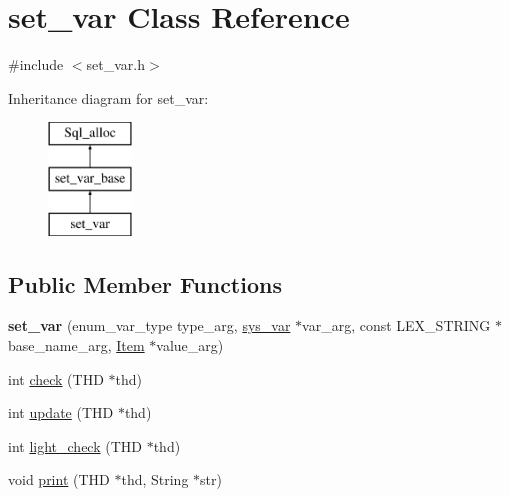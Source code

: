 \hypertarget{classset__var}{}\section{set\+\_\+var Class Reference}
\label{classset__var}


{\ttfamily \#include $<$set\+\_\+var.\+h$>$}

Inheritance diagram for set\+\_\+var\+:\begin{figure}[H]
\begin{center}
\leavevmode
\includegraphics[height=3.000000cm]{classset__var}
\end{center}
\end{figure}
\subsection*{Public Member Functions}
\begin{DoxyCompactItemize}
\item 
\mbox{\label{classset__var_a5adf33da65778929ccd5f9808ea14727}} 
{\bfseries set\+\_\+var} (enum\+\_\+var\+\_\+type type\+\_\+arg, \mbox{\hyperlink{classsys__var}{sys\+\_\+var}} $\ast$var\+\_\+arg, const L\+E\+X\+\_\+\+S\+T\+R\+I\+NG $\ast$base\+\_\+name\+\_\+arg, \mbox{\hyperlink{classItem}{Item}} $\ast$value\+\_\+arg)
\item 
int \mbox{\hyperlink{classset__var_a9d3bbbfa65cf51f9770ef2bd9c77ddcc}{check}} (T\+HD $\ast$thd)
\item 
int \mbox{\hyperlink{classset__var_a442c881d2848fa5da00c6060e91eb2b2}{update}} (T\+HD $\ast$thd)
\item 
int \mbox{\hyperlink{classset__var_ab20eacdd5174799bade9d3d80cb51168}{light\+\_\+check}} (T\+HD $\ast$thd)
\item 
void \mbox{\hyperlink{classset__var_ae336aa6a215d69563fba401c45d9ff96}{print}} (T\+HD $\ast$thd, String $\ast$str)
\end{DoxyCompactItemize}
